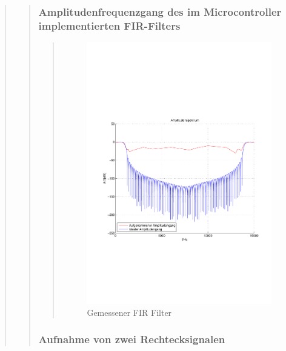 \begin{quote}
\begin{quote}
        \subsubsection{Amplitudenfrequenzgang des im Microcontroller
        implementierten FIR-Filters}
    	\begin{quote}
            \begin{figure}[H]
            \centering
                \includegraphics[scale=0.7, trim = 1.5cm 6.5cm 1cm 7.5cm, clip]{./Bilder/gemessener_FIR_Filter}
                    \caption{Gemessener FIR Filter}
            \end{figure}
    
    	\end{quote}
    	
    	
    	\subsubsection{Aufnahme von zwei Rechtecksignalen}
    	\begin{quote}
    	

\end{quote}
\end{quote}
\end{quote}
